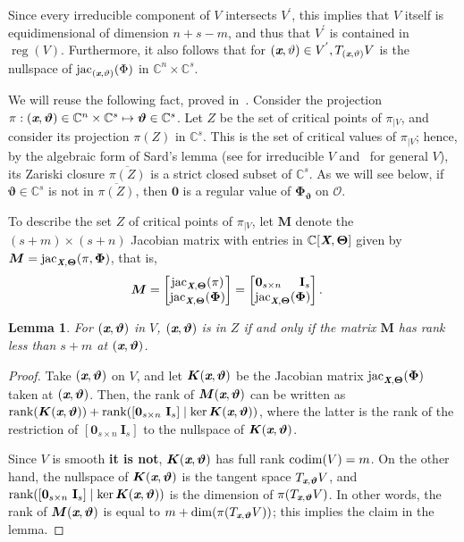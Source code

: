 \documentclass[a4paper]{article}
\def\sO{\mathscr{O}}
\def\Xb{\textit{\textbf{X}}}
\def\Thetab{\bm{\Theta}}
\def\thetab{\bm{\vartheta}}
\def\xb{\textit{\textbf{x}}}
\def\vt{\vartheta}
\DeclareMathOperator{\jac}{jac}
\DeclareMathOperator{\reg}{reg}
\def\dt{s}
\def\C{\mathbb{C}}
\def\bbm{\begin{bmatrix}}
\def\ebm{\end{bmatrix}}
\newtheorem{lemma}[theorem]{Lemma}
\begin{document}
    Since every irreducible component of $V$ intersects $V^{'}$, this implies that $V$ itself is equidimensional of dimension $n+s-m$, and thus that $V^{'}$ is contained in $\reg (V)$. Furthermore, it also follows that for $(\xb,\vt) \in V^{'}, T_{(\xb,\vt)}V$ is the nullspace of $\jac_{(\xb,\vt)}(\Phi)$ in $\C^n \times \C^s.$  
    
    We will reuse the following fact, proved in~\cite{TWT}.  Consider the
    projection $\pi:(\xb, \thetab) \in \C^n \times \C^{\dt} \mapsto
    \thetab \in\C^{\dt}$.  Let $Z$ be the set of critical points of
    $\pi_{|V}$, and consider its projection $\pi(Z)$ in $\C^s$. This is
    the set of critical values of $\pi_{|V}$; hence, by the algebraic form
    of Sard's lemma (see \cite[Theorem~3.7]{Mumford76} for irreducible $V$
    and~\cite[Proposition~B.2]{TWT} for general $V$), its Zariski closure
    $\overline{\pi(Z)}$ is a strict closed subset of $\C^s$. As we will
    see below, if $\thetab \in \C^{\dt}$ is not in $\overline{\pi(Z)}$,
    then $\bm 0$ is a regular value of $\bm\Phi_{\thetab}$ on $\sO.$
    
    To describe the set $Z$ of critical points of $\pi_{|V}$, let $\bm M$
    denote the $(s+m) \times (s+n)$ Jacobian matrix with entries in
    $\C[\Xb,\Thetab]$ given by $\bm M = \jac_{\Xb,\Thetab}(\pi,\bm\Phi)$,
    that is,
    \begin{align*}
    \bm M &= 
    \bbm 
    \jac_{\Xb,\Thetab}(\pi)\\
    \jac_{\Xb,\Thetab}(\bm\Phi) 
    \ebm 
    =
    \bbm 
    \textbf{0}_{\dt \times n}\hspace{5mm}\textbf{I}_{\dt} \\
    \jac_{\Xb,\Thetab}(\bm\Phi)
    \ebm.
    \end{align*}

    \begin{lemma} 
      For $(\xb,\thetab)$ in $V$, $(\xb,\thetab)$ is in $Z$ if and only if
      the matrix $\bm M$ has rank less than $\dt+m$ at $(\xb,\thetab)$.
    \end{lemma}
    \begin{proof}
      Take $(\xb,\thetab)$ on $V$, and let $\bm K(\xb,\thetab)$ be the
      Jacobian matrix $\jac_{\Xb,\Thetab}(\bm\Phi)$ taken at $(\xb,\thetab)$.
      Then, the rank of $\bm M(\xb,\thetab)$ can be written as
      $\textup{rank}(\bm K(\xb,\thetab)) + \textup{rank}([\textbf{0}_{\dt
          \times n}~\textbf{I}_{\dt}] \mid \ker \bm K(\xb,\thetab))$, where
      the latter is the rank of the restriction of $[\textbf{0}_{\dt
          \times n}~\textbf{I}_{\dt}]$ to the nullspace of
      $\bm K(\xb,\thetab)$.
    
      Since $V$ is smooth {\bf it is not}, $\bm K(\xb,\thetab)$ has full rank ${\rm codim}
      (V) = m$. On the other hand, the nullspace of $\bm K(\xb,\thetab)$
      is the tangent space $T_{\xb,\thetab} V$, and
      $\textup{rank}([\textbf{0}_{\dt \times n}~\textbf{I}_{\dt}] \mid
      \ker \bm K(\xb,\thetab))$ is the dimension of $\pi(T_{\xb,\thetab}
      V)$.  In other words, the rank of $\bm M(\xb,\thetab)$ is equal to
      $m+\dim(\pi(T_{\xb,\thetab} V))$; this implies the claim in the
      lemma.
    \end{proof}
\end{document}
